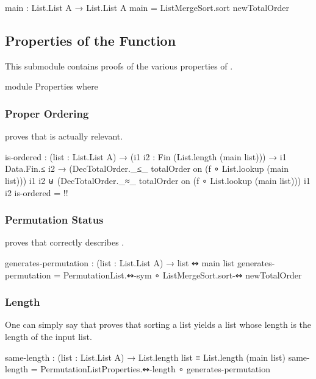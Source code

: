 \documentclass{report}
\begin{document}
\begin{code}
  main : List.List A → List.List A
  main = ListMergeSort.sort newTotalOrder
\end{code}

\subsection{Properties of the Function}
This submodule contains proofs of the various properties of .

\begin{code}
  module Properties where
\end{code}

\subsubsection{Proper Ordering}
 proves that  is actually relevant.

\begin{code}
    is-ordered :
      (list : List.List A) →
      (i1 i2 : Fin (List.length (main list))) →
      i1 Data.Fin.≤ i2 →
      (DecTotalOrder._≤_ totalOrder on (f ∘ List.lookup (main list))) i1 i2 ⊎
      (DecTotalOrder._≈_ totalOrder on (f ∘ List.lookup (main list))) i1 i2
    is-ordered = {!!}
\end{code}

\subsubsection{Permutation Status}
 proves that  correctly describes .

\begin{code}
    generates-permutation : (list : List.List A) → list ↭ main list
    generates-permutation = PermutationList.↭-sym ∘ ListMergeSort.sort-↭ newTotalOrder
\end{code}

\subsubsection{Length}
One can simply say that  proves that sorting a list yields a list whose length is the length of the input list.

\begin{code}
    same-length : (list : List.List A) → List.length list ≡ List.length (main list)
    same-length = PermutationListProperties.↭-length ∘ generates-permutation
\end{code}
\end{document}
